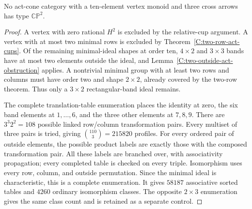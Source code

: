 \begin{proposition}
\label{C:ten-three-row-three-point-acts}
No act-cone category with a ten-element vertex monoid and three
cross arrows has type $\mathbb{CP}^2$.
\end{proposition}
\begin{proof}
A vertex with zero rational $H^2$ is excluded by the relative-cup
argument.  A vertex with at most two minimal rows is excluded by
Theorem~\ref{C:two-row-act-cups}.  Of the remaining minimal-ideal
shapes at order ten, $4\times2$ and $3\times3$ bands have at
most two elements outside the ideal, and
Lemma~\ref{C:two-outside-act-obstruction} applies.  A nontrivial
minimal group with at least two rows and columns must have order
two and shape $2\times2$, already covered by the two-row theorem.
Thus only a $3\times2$ rectangular-band ideal remains.

The complete translation-table enumeration
 places the identity at
zero, the six band elements at $1,\ldots,6$, and the three other
elements at $7,8,9$.  There are $3^3 2^2=108$ possible linked
row/column transformation pairs.  Every multiset of three pairs
is tried, giving $\binom{110}{3}=215820$ profiles.  For every
ordered pair of outside elements, the possible product labels
are exactly those with the composed transformation pair.
All these labels are branched over, with associativity propagation;
every completed table is checked on every triple.  Isomorphism
uses every row, column, and outside permutation.  Since the
minimal ideal is characteristic, this is a complete enumeration.
It gives $58187$ associative sorted tables and $4260$ ordinary
isomorphism classes.  The opposite $2\times3$ enumeration gives
the same class count and is retained as a separate control.


\end{proof}
